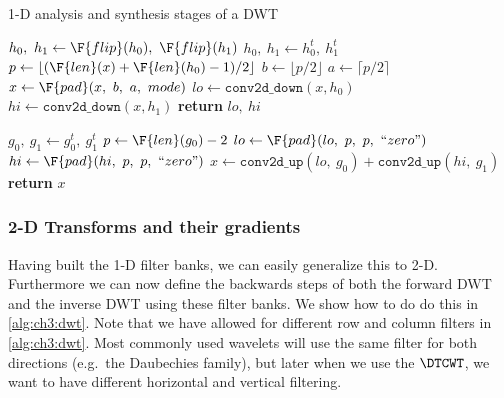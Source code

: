 \begin{algorithm}[tb]
\caption{1-D analysis and synthesis stages of a DWT}\label{alg:ch3:fb1d}
\begin{algorithmic}[1]
  \State $ h_0,\ h_1 \gets \F{flip}(h_0),\ \F{flip}(h_1) $
    \State $h_0,\ h_1 \gets h_0^t,\ h_1^t$  
  \EndIf
  \State $p \gets \lfloor (\F{len}(x) + \F{len}(h_0) - 1) / 2 \rfloor$ 
  \State $b \gets \lfloor p/2 \rfloor$ 
  \State $a \gets \lceil p/2 \rceil$ 
  \State $x \gets \F{pad}(x,\ b,\ a,\ mode)$  
  \State $lo \gets \mathtt{conv2d\_down} (x, h_0)$
  \State $hi \gets \mathtt{conv2d\_down} (x, h_1)$
  \State \textbf{return} $lo,\ hi$
\EndFunction
\end{algorithmic}\vspace{10pt}
\begin{algorithmic}[1]
    \State $g_0,\ g_1 \gets g_0^t,\ g_1^t$  
  \EndIf
  \State $p \gets \F{len}(g_0) - 2$ 
  \State $lo \gets \F{pad}(lo,\ p,\ p,\ ``zero")$  
  \State $hi \gets \F{pad}(hi,\ p,\ p,\ ``zero")$  
  \State $x \gets \mathtt{conv2d\_up}(lo,\ g_0) + \mathtt{conv2d\_up}(hi,\ g_1)$
  \State \textbf{return} $x$
\EndFunction
\end{algorithmic}
\end{algorithm}

\subsubsection{2-D Transforms and their gradients}
Having built the 1-D filter banks, we can easily generalize this to 2-D.
Furthermore we can now define the backwards steps of both the forward DWT
and the inverse DWT using these filter banks. We show how to do do this in 
\autoref{alg:ch3:dwt}. Note that we have allowed for different row and column
filters in \autoref{alg:ch3:dwt}. Most commonly used wavelets will use the same 
filter for both directions (e.g.\ the Daubechies family), but later when we use the $\DTCWT$, 
we want to have different horizontal and vertical filtering. 


